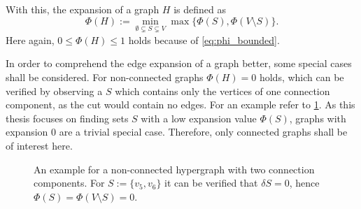 With this, the expansion of a graph $H$ is defined as \begin{equation}
\Phi(H) := \min_{\emptyset \subsetneq S \subsetneq V} \max \{\Phi(S), \Phi(V\setminus S)\}.
\end{equation} Here again, $0\le \Phi(H)\le 1$ holds because of \cref{eq:phi_bounded}.

In order to comprehend the edge expansion of a graph better, some special cases shall be considered.
For non-connected graphs $\Phi(H) = 0$ holds, which can be verified by observing a $S$ which contains only the vertices of one connection component, as the cut would contain no edges. For an example refer to \cref{fig:exapmle_non_connected_hypergraph}. 
As this thesis focuses on finding sets $S$ with a low expansion value $\Phi(S)$, graphs with expansion $0$ are a trivial special case. Therefore, only connected graphs shall be of interest here.

\begin{figure} [htpb]
	\centering
	\caption[Example non-connected hypergraph]{An example for a non-connected hypergraph with two connection components. For $S:= \{v_5, v_6\} $ it can be verified that $\delta S = 0$, hence $\Phi(S) =\Phi(V\setminus S) = 0$. }\label{fig:exapmle_non_connected_hypergraph}
\end{figure}

